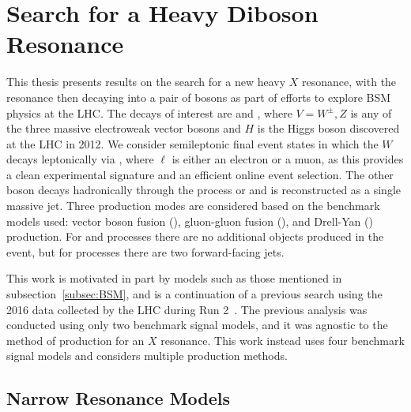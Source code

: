 \section{Search for a Heavy Diboson Resonance}
\label{sec:search}

This thesis presents results on the search for a new heavy $X$ resonance, with the resonance then decaying into a pair of bosons as part of efforts to explore BSM physics at the LHC.
The decays of interest are \XtoWV and \XtoWH, where $V=W^\pm,Z$ is any of the three massive electroweak vector bosons and $H$ is the Higgs boson discovered at the LHC in 2012.
We consider semileptonic final event states in which the $W$ decays leptonically via \Wtolnu, where $\ell$ is either an electron or a muon, as this provides a clean experimental signature and an efficient online event selection.
The other \VorH boson decays hadronically through the process \Vtoqqbarpr or \Htobbbar and is reconstructed as a single massive jet.
Three production modes are considered based on the benchmark models used: vector boson fusion (\VBF), gluon-gluon fusion (\ggF), and Drell-Yan (\DY) production.
For \ggF and \DY processes there are no additional objects produced in the event, but for \VBF processes there are two forward-facing jets.

This work is motivated in part by models such as those mentioned in subsection~\ref{subsec:BSM}, and is a continuation of a previous search using the 2016 data collected by the LHC during Run 2~\cite{Sirunyan_18}.
The previous analysis was conducted using only two benchmark signal models, and it was agnostic to the method of production for an $X$ resonance.
This work instead uses four benchmark signal models and considers multiple production methods.

\subsection{Narrow Resonance Models}
\label{subsec:benchmark}

